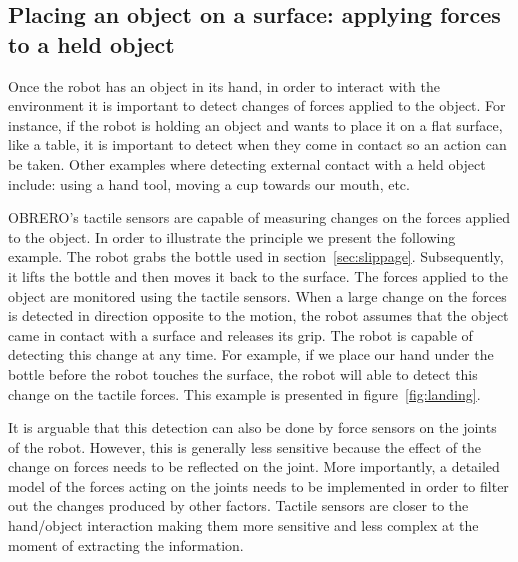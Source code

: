 


\subsection{Placing an object on a surface: applying forces to a held object}

Once the robot has an object in its hand, in order to interact
with the environment it is important to detect changes of forces
applied to the object. For instance, if the robot is holding an
object and wants to place it on a flat surface, like a table, it
is important to detect when they come in contact so an action can
be taken. Other examples where detecting external contact with a
held object include: using a hand tool, moving a cup towards our
mouth, etc.

OBRERO's tactile sensors are capable of measuring changes on the
forces applied to the object. In order to illustrate the principle
we present the following example. The robot grabs the bottle used
in section~\ref{sec:slippage}. Subsequently, it lifts the bottle
and then moves it back to the surface. The forces applied to the
object are monitored using the tactile sensors. When a large
change on the forces is detected in direction opposite to the
motion, the robot assumes that the object came in contact with a
surface and releases its grip. The robot is capable of detecting
this change at any time. For example, if we place our hand under
the bottle before the robot touches the surface, the robot will
able to detect this change on the tactile forces. This example is
presented in figure~\ref{fig:landing}.


It is arguable that this detection can also be done by force
sensors on the joints of the robot. However, this is generally
less sensitive because the effect of the change on forces needs to
be reflected on the joint. More importantly, a detailed model of
the forces acting on the joints needs to be implemented in order
to filter out the changes produced by other factors. Tactile
sensors are closer to the hand/object interaction making them more
sensitive and less complex at the moment of extracting the
information.

